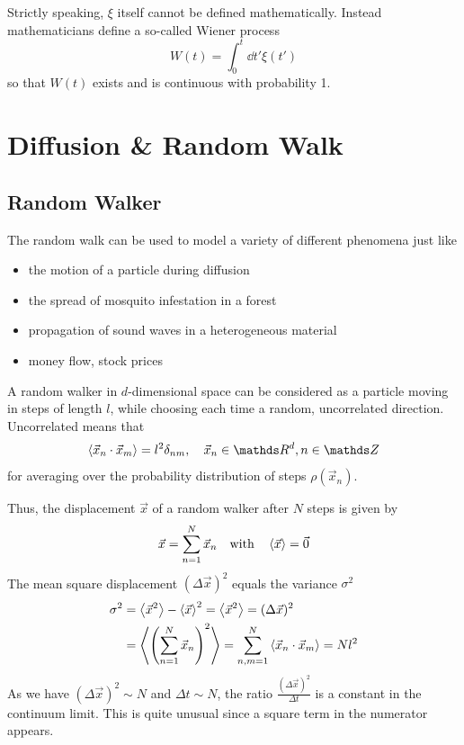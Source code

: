 \documentclass{notebook}
\begin{document}
\begin{remark}
	Strictly speaking, $\xi$ itself cannot be defined mathematically. Instead mathematicians define a so-called Wiener process 
	\begin{equation}
	W(t) = \int_0^t{\dd{t'} \xi(t')}
	\end{equation}
	so that $W(t)$ exists and is continuous with probability 1.
\end{remark}


\chapter{Diffusion \& Random Walk}

\section{Random Walker}

The random walk can be used to model a variety of different phenomena just like
%
\begin{itemize}
	\item{the motion of a particle during diffusion}
	\item{the spread of mosquito infestation in a forest}
	\item{propagation of sound waves in a heterogeneous material}
	\item{money flow, stock prices}
\end{itemize}
%

%
\begin{mdframed}[style=default, frametitle={Model: Random Walker}]
	A random walker in $d$-dimensional space can be considered as a particle moving in steps of length $l$, while choosing each time a random, uncorrelated direction. Uncorrelated means that
	\begin{equation}
	\expval{\vec{x}_n \cdot \vec{x}_m} = l^2 \delta_{nm}, \quad \vec{x}_n \in \R^d, n \in \Z
	\end{equation}
	for averaging over the probability distribution of steps $\rho(\vec{x}_n)$.
\end{mdframed}
%

Thus, the displacement $\vec{x}$ of a random walker after $N$ steps is given by
%
\begin{equation}
\vec{x} = \sum^N_{n = 1}{\vec{x}_n} \quad \mathrm{with} \quad \expval{\vec{x}} = \vec{0}
\end{equation}
%
The mean square displacement $(\Delta \vec{x})^2$ equals the variance $\sigma^2$
%
\begin{align*}
\sigma^2 &= \expval{\vec{x}^2} - \expval{\vec{x}}^2 = \expval{\vec{x}^2} = (\Delta \vec{x})^2 \\ 
&= \expval{\left( \sum^N_{n = 1}{\vec{x}_n} \right)^2} = \sum^N_{n, m = 1}\expval{\vec{x}_n \cdot \vec{x}_m} = N l^2
\end{align*}
%
As we have $(\Delta \vec{x})^2 \sim N$ and $\Delta t \sim N $, the ratio $\frac{(\Delta \vec{x})^2}{\Delta t}$ is a constant in the continuum limit. This is quite unusual since a square term in the numerator appears.  
\end{document}

